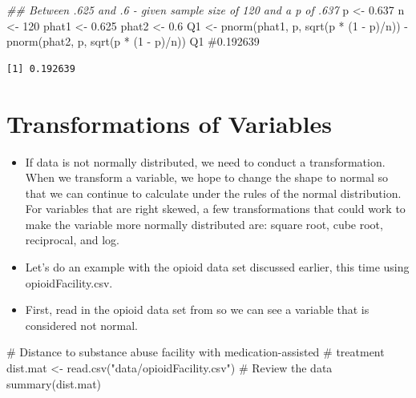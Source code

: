 \documentclass[
  letterpaper,
  DIV=11,
  numbers=noendperiod]{scrreprt}
\newenvironment{Shaded}{\begin{snugshade}}{\end{snugshade}}
\newcommand{\CommentTok}[1]{\textcolor[rgb]{0.37,0.37,0.37}{#1}}
\newcommand{\DecValTok}[1]{\textcolor[rgb]{0.68,0.00,0.00}{#1}}
\newcommand{\DocumentationTok}[1]{\textcolor[rgb]{0.37,0.37,0.37}{\textit{#1}}}
\newcommand{\FloatTok}[1]{\textcolor[rgb]{0.68,0.00,0.00}{#1}}
\newcommand{\FunctionTok}[1]{\textcolor[rgb]{0.28,0.35,0.67}{#1}}
\newcommand{\NormalTok}[1]{\textcolor[rgb]{0.00,0.23,0.31}{#1}}
\newcommand{\OtherTok}[1]{\textcolor[rgb]{0.00,0.23,0.31}{#1}}
\newcommand{\SpecialCharTok}[1]{\textcolor[rgb]{0.37,0.37,0.37}{#1}}
\newcommand{\StringTok}[1]{\textcolor[rgb]{0.13,0.47,0.30}{#1}}
\begin{document}
\begin{Shaded}
\begin{Highlighting}[]
\DocumentationTok{\#\# Between .625 and .6 {-} given sample size of 120 and a p of .637}
\NormalTok{p }\OtherTok{\textless{}{-}} \FloatTok{0.637}
\NormalTok{n }\OtherTok{\textless{}{-}} \DecValTok{120}
\NormalTok{phat1 }\OtherTok{\textless{}{-}} \FloatTok{0.625}
\NormalTok{phat2 }\OtherTok{\textless{}{-}} \FloatTok{0.6}
\NormalTok{Q1 }\OtherTok{\textless{}{-}} \FunctionTok{pnorm}\NormalTok{(phat1, p, }\FunctionTok{sqrt}\NormalTok{(p }\SpecialCharTok{*}\NormalTok{ (}\DecValTok{1} \SpecialCharTok{{-}}\NormalTok{ p)}\SpecialCharTok{/}\NormalTok{n)) }\SpecialCharTok{{-}} \FunctionTok{pnorm}\NormalTok{(phat2, p, }\FunctionTok{sqrt}\NormalTok{(p }\SpecialCharTok{*}\NormalTok{ (}\DecValTok{1} \SpecialCharTok{{-}}
\NormalTok{    p)}\SpecialCharTok{/}\NormalTok{n))}
\NormalTok{Q1  }\CommentTok{\#0.192639}
\end{Highlighting}
\end{Shaded}

\begin{verbatim}
[1] 0.192639
\end{verbatim}


\chapter{Transformations of
Variables}\label{transformations-of-variables}

\begin{itemize}
\item
  If data is not normally distributed, we need to conduct a
  transformation. When we transform a variable, we hope to change the
  shape to normal so that we can continue to calculate under the rules
  of the normal distribution. For variables that are right skewed, a few
  transformations that could work to make the variable more normally
  distributed are: square root, cube root, reciprocal, and log.
\item
  Let's do an example with the opioid data set discussed earlier, this
  time using opioidFacility.csv.
\item
  First, read in the opioid data set from so we can see a variable that
  is considered not normal.\\
\end{itemize}

\begin{Shaded}
\begin{Highlighting}[]
\CommentTok{\# Distance to substance abuse facility with medication{-}assisted}
\CommentTok{\# treatment}
\NormalTok{dist.mat }\OtherTok{\textless{}{-}} \FunctionTok{read.csv}\NormalTok{(}\StringTok{"data/opioidFacility.csv"}\NormalTok{)}
\CommentTok{\# Review the data}
\FunctionTok{summary}\NormalTok{(dist.mat)}
\end{Highlighting}
\end{Shaded}
\end{document}
